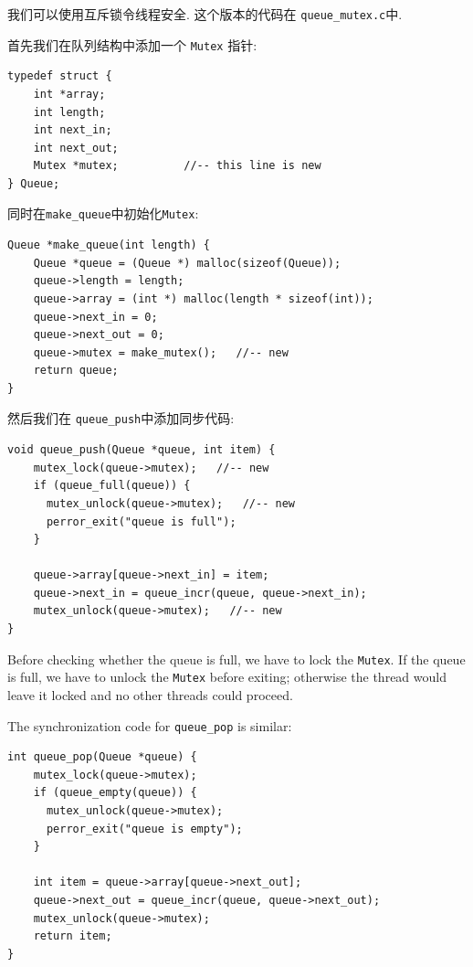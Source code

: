 \documentclass[12pt]{book}
\begin{document}
{我们可以使用互斥锁令线程安全. 
这个版本的代码在 \verb"queue_mutex.c"中.

首先我们在队列结构中添加一个 {\tt Mutex} 指针:

\begin{verbatim}
typedef struct {
    int *array;
    int length;
    int next_in;
    int next_out;
    Mutex *mutex;          //-- this line is new
} Queue;
\end{verbatim}

同时在\verb"make_queue"中初始化{\tt Mutex}:

\begin{verbatim}
Queue *make_queue(int length) {
    Queue *queue = (Queue *) malloc(sizeof(Queue));
    queue->length = length;
    queue->array = (int *) malloc(length * sizeof(int));
    queue->next_in = 0;
    queue->next_out = 0;
    queue->mutex = make_mutex();   //-- new
    return queue;
}
\end{verbatim}

然后我们在 \verb"queue_push"中添加同步代码:

\begin{verbatim}
void queue_push(Queue *queue, int item) {
    mutex_lock(queue->mutex);   //-- new
    if (queue_full(queue)) {
      mutex_unlock(queue->mutex);   //-- new
      perror_exit("queue is full");
    }
  
    queue->array[queue->next_in] = item;
    queue->next_in = queue_incr(queue, queue->next_in);
    mutex_unlock(queue->mutex);   //-- new
}
\end{verbatim}

Before checking whether the queue is full, we have to lock
the {\tt Mutex}.  If the queue is full, we have to unlock
the {\tt Mutex} before exiting; otherwise the thread would leave
it locked and no other threads could proceed.

The synchronization code for \verb"queue_pop" is similar:

\begin{verbatim}
int queue_pop(Queue *queue) {
    mutex_lock(queue->mutex);
    if (queue_empty(queue)) {
      mutex_unlock(queue->mutex);
      perror_exit("queue is empty");
    }
  
    int item = queue->array[queue->next_out];
    queue->next_out = queue_incr(queue, queue->next_out);
    mutex_unlock(queue->mutex);
    return item;
}
\end{verbatim}

}
\end{document}
